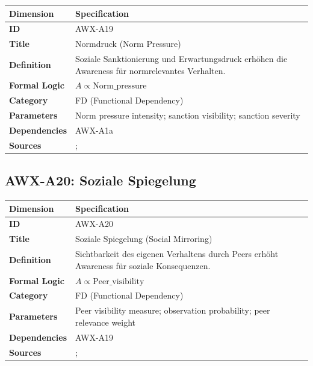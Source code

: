 \begin{table}[htbp]
\small
\begin{tabular}{p{3cm}p{11cm}}
\toprule
\textbf{Dimension} & \textbf{Specification} \\
\midrule
\textbf{ID} & AWX-A19 \\
\textbf{Title} & Normdruck (Norm Pressure) \\
\textbf{Definition} & Soziale Sanktionierung und Erwartungsdruck erhöhen die Awareness für normrelevantes Verhalten. \\
\textbf{Formal Logic} & $A \propto \text{Norm\_pressure}$ \\
\textbf{Category} & FD (Functional Dependency) \\
\textbf{Parameters} & Norm pressure intensity; sanction visibility; sanction severity \\
\textbf{Dependencies} & AWX-A1a \\
\textbf{Sources} & \citet{PAP-fehr2004social}; \citet{cialdini2004social} \\
\bottomrule
\end{tabular}
\end{table}


\subsection{AWX-A20: Soziale Spiegelung}

\begin{table}[htbp]
\small
\begin{tabular}{p{3cm}p{11cm}}
\toprule
\textbf{Dimension} & \textbf{Specification} \\
\midrule
\textbf{ID} & AWX-A20 \\
\textbf{Title} & Soziale Spiegelung (Social Mirroring) \\
\textbf{Definition} & Sichtbarkeit des eigenen Verhaltens durch Peers erhöht Awareness für soziale Konsequenzen. \\
\textbf{Formal Logic} & $A \propto \text{Peer\_visibility}$ \\
\textbf{Category} & FD (Functional Dependency) \\
\textbf{Parameters} & Peer visibility measure; observation probability; peer relevance weight \\
\textbf{Dependencies} & AWX-A19 \\
\textbf{Sources} & \citet{cialdini2004social}; \citet{PAP-gaechter2002altruistic} \\
\bottomrule
\end{tabular}
\end{table}

